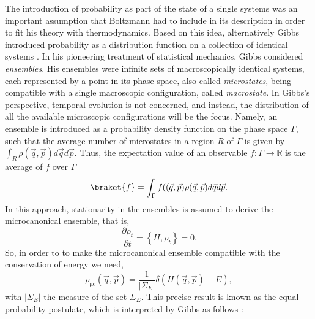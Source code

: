 The introduction of probability as part of the state of a single systems was an important assumption that Boltzmann had to include in its description in order to fit his theory with thermodynamics. Based on this idea, alternatively Gibbs introduced probability as a distribution function on a collection of identical systems \cite{gibbs_elementary_1902}. In his pioneering treatment of statistical mechanics, Gibbs considered \textit{ensembles}. His ensembles were infinite sets of macroscopically identical systems, each represented by a point in its phase space, also called \textit{microstates}, being compatible with a single macroscopic configuration, called \textit{macrostate}. In Gibbs's perspective, temporal evolution is not concerned, and instead, the distribution of all the available microscopic configurations will be the focus. Namely, an ensemble is introduced as a probability density function on the phase space $\Gamma$, such that the average number of microstates in a region $R$ of $\Gamma$ is given by $\int_{R}\rho(\vec{q},\vec{p}) d\vec{q}d\vec{p}$. Thus, the expectation value of an observable $f:\Gamma\rightarrow\mathbb{R}$ is the average of $f$ over $\Gamma$
\begin{equation}
\braket{f} = \int_{\Gamma} f((\vec{q},\vec{p})\rho(\vec{q},\vec{p})d\vec{q}d\vec{p}.
\label{CH1:Average_ensemble}
\end{equation}
In this approach, stationarity in the ensembles is assumed to derive the microcanonical ensemble, that is,
\begin{equation}
\frac{\partial \rho_{t}}{\partial t}=\left\{H, \rho_{t}\right\} = 0.
\end{equation}
So, in order to to make the microcanonical ensemble compatible with the conservation of energy we need,
\begin{equation}
\rho_{\mathrm{\mu c}}(\vec{q},\vec{p})=\frac{1}{\left|\Sigma_{E}\right|} \delta(H(\vec{q},\vec{p})-E),
\label{CH1:Microcanonical_ensemble}
\end{equation}
with $|\Sigma_E|$ the measure of the set $\Sigma_E$. This precise result is known as the equal probability postulate, which is interpreted by Gibbs as follows \cite{gibbs_elementary_1902}:

